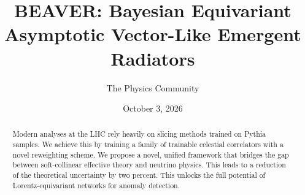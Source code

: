 \documentclass[11pt]{article}
\title{BEAVER: Bayesian Equivariant Asymptotic Vector-Like Emergent Radiators}
\author{The Physics Community}
\date{October 3, 2026}
\begin{document}
\maketitle
\begin{abstract}
Modern analyses at the LHC rely heavily on slicing methods trained on
Pythia samples. We achieve this by training a family of trainable
celestial correlators with a novel reweighting scheme. We propose a
novel, unified framework that bridges the gap between soft-collinear
effective theory and neutrino physics. This leads to a reduction of the
theoretical uncertainty by two percent. This unlocks the full potential
of Lorentz-equivariant networks for anomaly detection.
\end{abstract}
\tableofcontents



\nocite{*}


\end{document}
